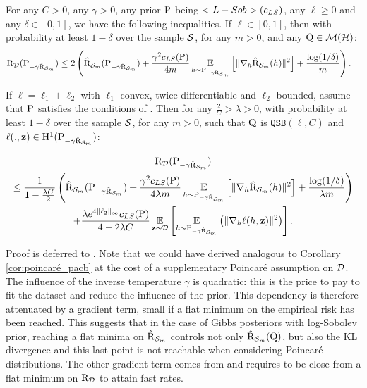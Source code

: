 \begin{theorem}\label{th: gibbs_pacb}
For any $C>0$, any $\gamma>0$, any prior $\P$ being $\Lsob(c_{LS})$, any $\ell\geq 0$ and any $\delta\in [0,1]$, we have the following inequalities.
If $\ell\in [0,1]$, then with probability at least $1-\delta$ over the sample $\S$, for any $m>0$, and any $\Q\in\Mcal(\Hcal)$:
\begin{align*}
    \Risk_{\D}(\P_{-\gamma \hat{\Risk}_{\S_m}}) & \leq 2 \LP \hat{\Risk}_{\S_m}(\P_{-\gamma \hat{\Risk}_{\S_m}}) + \frac{\gamma^2 c_{LS}(\P)}{4m} \EE_{h\sim \P_{-\gamma \hat{\Risk}_{\S_m}}}\LB \|\nabla_h \hat{\Risk}_{\S_m}(h) \|^2 \RB + \frac{\log(1/\delta)}{m} \RP .
\end{align*}

If $\ell= \ell_1+\ell_2$ with $\ell_1$ convex, twice differentiable and $\ell_2$ bounded, assume that $\P$ satisfies the conditions of . Then for any $\frac{2}{C}> \lambda>0$, with probability at least $1-\delta$ over the sample $\S$, for any $m>0$, such that $\Q$ is $\texttt{QSB}(\ell,C)$ and $\ell(.,\z)\in \mathrm{H}^{1}(\P_{-\gamma \hat{\Risk}_{\S_m}})$:

\begin{multline*}
    \Risk_{\D}(\P_{-\gamma \hat{\Risk}_{\S_m}}) \\ \leq 
     \frac{1}{1-\frac{\lambda C}{2}} \LP \hat{\Risk}_{\S_m}(\P_{-\gamma \hat{\Risk}_{\S_m}}) + \frac{\gamma^2 c_{LS}(\P)}{4\lambda m} \EE_{h\sim \P_{-\gamma \hat{\Risk}_{\S_m}}}\LB \|\nabla_h \hat{\Risk}_{\S_m}(h) \|^2 \RB + \frac{\log(1/\delta)}{\lambda m} \RP \\ 
    + \frac{\lambda e^{4\|\ell_2\|_{\infty}}c_{LS}(\P) }{4-2\lambda C} \EE_{\z\sim\D} \LB \EE_{h\sim \P_{-\gamma \hat{\Risk}_{\S_m}}}\LP \|\nabla_h \ell(h,\z)\|^2 \RP \RB .
\end{multline*} 
\end{theorem}
Proof is deferred to .
Note that we could have derived analogous to Corollary \ref{cor:poincaré_pacb} at the cost of a supplementary Poincaré assumption on $\D$.
The influence of the inverse temperature $\gamma$ is quadratic: this is the price to pay to fit the dataset and reduce the influence of the prior.
This dependency is therefore attenuated by a gradient term, small if a flat minimum on the empirical risk has been reached.
This suggests that in the case of Gibbs posteriors with log-Sobolev prior, reaching a flat minima on $\hat{\Risk}_{\S_m}$ controls not only $\hat{\Risk}_{\S_m}(\Q)$, but also the KL divergence and this last point is not reachable when considering Poincaré distributions.
The other gradient term comes from  and requires to be close from a flat minimum on $\Risk_\D$ to attain fast rates. 

